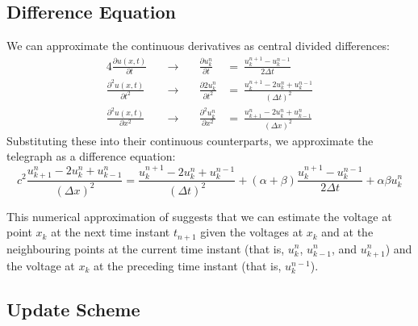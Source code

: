 \documentclass{article}
\begin{document}
\subsection{Difference Equation}
\label{subsec: Difference Equation}

We can approximate the continuous derivatives as central divided differences:
\begin{alignat*}{4}
   \frac{\partial u \left(x,t\right)}{\partial t}
   &\quad\longrightarrow\quad&
   \frac{\partial u_{k}^{n}}{\partial t}
   &=\ 
   \frac{u_{k}^{n+1} - u_{k}^{n-1}}{2 \Delta t} \\
   \frac{\partial^{2} u \left(x,t\right)}{\partial t^{2}}
   &\quad\longrightarrow\quad&
   \frac{\partial{2} u_{k}^{n}}{\partial t^{2}}
   &=\ 
   \frac{u_{k}^{n+1} - 2 u_{k}^{n} + u_{k}^{n-1}}{\left(\Delta t\right)^{2}} \\
   \frac{\partial^{2} u \left(x,t\right)}{\partial x^{2}}
   &\quad\longrightarrow\quad&
   \frac{\partial^{2} u_{k}^{n}}{\partial x^{2}}
   &=\ 
   \frac{u_{k+1}^{n} - 2 u_{k}^{n} + u_{k-1}^{n}}{\left(\Delta x\right)^{2}}
\end{alignat*}
Substituting these into their continuous counterparts, we approximate the telegraph as a difference equation:
\begin{equation}
   \label{eqn: Difference eqn full}
   c^{2} \frac{u_{k+1}^{n} - 2 u_{k}^{n} + u_{k-1}^{n}}{\left(\Delta x\right)^{2}}
   =
   \frac{u_{k}^{n+1} - 2 u_{k}^{n} + u_{k}^{n-1}}{\left(\Delta t\right)^{2}}
   +
   \left(\alpha + \beta\right) \frac{u_{k}^{n+1} - u_{k}^{n-1}}{2 \Delta t}
   +
   \alpha \beta u_{k}^{n}
\end{equation}

This numerical approximation of  suggests that we can estimate the voltage
at point $x_{k}$ at the next time instant $t_{n+1}$ given the voltages at $x_{k}$ and
at the neighbouring points at the current time instant
(that is, $u_{k}^{n}$, $u_{k-1}^{n}$, and $u_{k+1}^{n}$) and
the voltage at $x_{k}$ at the preceding time instant
(that is, $u_{k}^{n-1}$).

\subsection{Update Scheme}
\label{subsec: Update Scheme}
\end{document}
